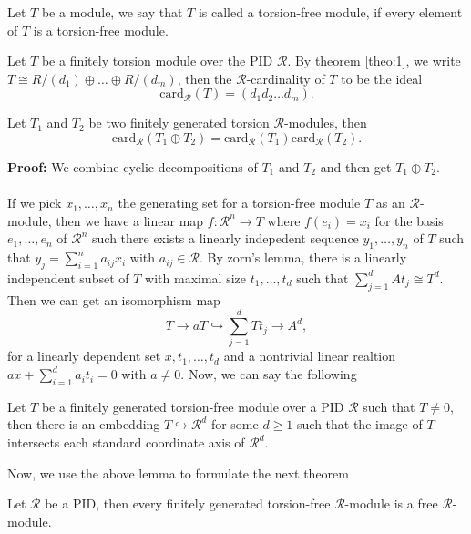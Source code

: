 \documentclass[11pt]{scrartcl}
\newcommand{\CR}{\mathcal R}
\newcommand{\card}{\text{card}}
\begin{document}
\begin{definition*}
  Let $T$ be a module, we say that $T$ is called a torsion-free module, if every
  element of $T$ is a torsion-free module.
\end{definition*}

\begin{definition*}
  Let $T$ be a finitely torsion module over the PID $\CR$. By theorem \ref{theo:1},
  we write $T \cong R/(d_{1}) \oplus \dots \oplus R/(d_{m})$, then the $\CR$-cardinality of $T$ to be the ideal
  $$
  \card_{\CR}(T) = (d_{1}d_{2} \dots d_{m}).
  $$
\end{definition*}

\begin{theorem}
  \label{theo:3}
  Let $T_{1}$ and $T_{2}$ be two finitely generated torsion $\CR$-modules, then
  $$
  \card_{\CR}(T_{1} \oplus T_{2}) = \card_{\CR}(T_{1}) \card_{\CR}(T_{2}).
  $$
\end{theorem}
\textbf{Proof: }We combine cyclic decompositions of $T_{1}$ and $T_{2}$
and then get $T_{1} \oplus T_{2}$. \qedsymbol \\ \\
If we pick $x_{1}, \dots, x_{n}$ the generating set for a torsion-free module $T$ as an $\CR$-module,
then we have a linear map $f: \CR^{n} \longrightarrow T$ where $f(e_{i}) = x_{i}$
for the basis $e_{1}, \dots, e_{n}$ of $\CR^{n}$ such there exists a linearly
indepedent sequence $y_{1}, \dots, y_{n}$ of $T$ such that $y_{j} = \sum_{i=1}^{n} a_{ij}x_{i}$ with $a_{ij} \in \CR$. By zorn's lemma, there is a linearly
independent subset of $T$ with maximal size $t_{1}, \dots, t_{d}$ such that
$\sum_{j=1}^{d} At_{j} \cong T^{d}$. Then we can get an isomorphism map
$$
T \rightarrow aT \hookrightarrow \sum_{j=1}^{d} Tt_{j} \rightarrow A^{d},
$$
for a linearly dependent set $x, t_{1}, \dots, t_{d}$ and a nontrivial linear
realtion $ax + \sum_{i=1}^{d} a_{i}t_{i} = 0$ with $a \neq 0$. Now, we can
say the following
\begin{lemma}
  \label{lem:3}
  Let $T$ be a finitely generated torsion-free module over a PID $\CR $ such that
  $T \neq 0$, then there is an embedding $T \hookrightarrow \CR^{d}$ for some
  $d \geq 1$ such that the image of $T$ intersects each standard coordinate
  axis of $\CR^{d}$.
\end{lemma}
Now, we use the above lemma to formulate the next theorem
\begin{theorem}
  \label{theo:4}
  Let $\CR$ be a PID, then every finitely generated torsion-free $\CR$-module
  is a free $\CR$-module.
\end{theorem}
\end{document}
